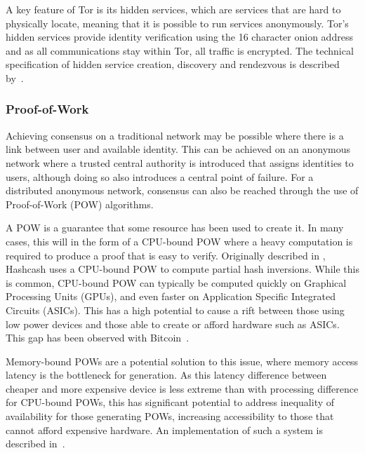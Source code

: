 			A key feature of Tor is its hidden services, which are services that are hard to physically locate, meaning that it is possible to run services anonymously. Tor's hidden services provide identity verification using the 16 character onion address and as all communications stay within Tor, all traffic is encrypted. The technical specification of hidden service creation, discovery and rendezvous is described by~\cite{tor_rend}.
			
		\subsubsection*{Proof-of-Work}
			Achieving consensus on a traditional network may be possible where there is a link between user and available identity. This can be achieved on an anonymous network where a trusted central authority is introduced that assigns identities to users, although doing so also introduces a central point of failure. For a distributed anonymous network, consensus can also be reached through the use of Proof-of-Work (POW) algorithms.
			
			A POW is a guarantee that some resource has been used to create it. In many cases, this will in the form of a CPU-bound POW where a heavy computation is required to produce a proof that is easy to verify. Originally described in \cite{back2002hashcash}, Hashcash uses a CPU-bound POW to compute partial hash inversions. While this is common, CPU-bound POW can typically be computed quickly on Graphical Processing Units (GPUs), and even faster on Application Specific Integrated Circuits (ASICs). This has a high potential to cause a rift between those using low power devices and those able to create or afford hardware such as ASICs. This gap has been observed with Bitcoin~\cite{peck2013bitcoin}.
			
			Memory-bound POWs are a potential solution to this issue, where memory access latency is the bottleneck for generation. As this latency difference between cheaper and more expensive device is less extreme than with processing difference for CPU-bound POWs, this has significant potential to address inequality of availability for those generating POWs, increasing accessibility to those that cannot afford expensive hardware. An implementation of such a system is described in~\cite{cuckoo}.
